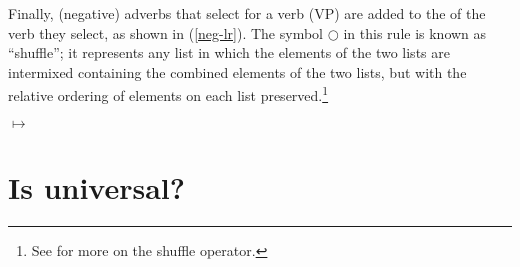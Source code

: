 \documentclass[output=paper,biblatex,babelshorthands,newtxmath,draftmode,colorlinks, citecolor=brown]{langscibook}
\begin{document}
Finally, (negative) adverbs that select for a verb (VP) are added to the \argst of the verb they select, as shown in (\ref{neg-lr}). 
The symbol $\bigcirc$\is{$\bigcirc$} in this rule is known as ``shuffle''; it represents any list 
 in which the elements of the two lists are intermixed
containing the combined elements of the two lists, but with the relative ordering of elements on each list preserved.\footnote{
See \crossrefchapterw[\pageref{order:rel-shuffle}]{order} for more on the shuffle operator.}


\begin{exe}
	\ex\label{neg-lr}
\avm{
	[arg-st & \1 ]
}
	$\mapsto$
\end{exe}

 

\section{Is  \texorpdfstring{\argst}{ARG-ST} universal?}

%
\end{document}
